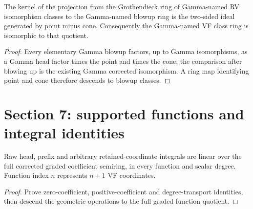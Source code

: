\begin{theorem}

\label{s7-gn-13}


\leanok

The kernel of the projection from the Grothendieck ring of Gamma-named RV isomorphism classes to the Gamma-named blowup ring is the two-sided ideal generated by point minus cone. Consequently the Gamma-named VF class ring is isomorphic to that quotient.

\end{theorem}

\begin{proof}


\leanok

Every elementary Gamma blowup factors, up to Gamma isomorphisms, as a Gamma head factor times the point and times the cone; the comparison after blowing up is the existing Gamma corrected isomorphism. A ring map identifying point and cone therefore descends to blowup classes.

\end{proof}

\section{Section 7: supported functions and integral identities}


\begin{theorem}

\label{s7-linear}


\leanok

Raw head, prefix and arbitrary retained-coordinate integrals are linear over the full corrected graded coefficient semiring, in every function and scalar degree. Function index $n$ represents $n+1$ VF coordinates.

\end{theorem}

\begin{proof}


\leanok

Prove zero-coefficient, positive-coefficient and degree-transport identities, then descend the geometric operations to the full graded function quotient.

\end{proof}

